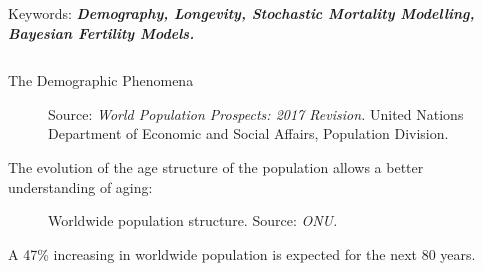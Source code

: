 \documentclass[]{beamer}
\begin{document}
\begin{frame}{\vspace{1ex}\hfill Keywords: \bfseries \textit{Demography, Longevity, Stochastic Mortality Modelling, Bayesian Fertility Models.}}
\begin{columns}[t]
\begin{block}{The Demographic Phenomena}
\begin{multicols}{2}
				\begin{figure}[h]
				\vspace{-0.4cm}
					\centering
					\caption{\small Source: \textit{World Population Prospects: 2017 Revision.} United Nations Department of Economic and Social Affairs, Population Division.}
					\label{fertilidad}
				\end{figure}
				The evolution of the age structure of the population allows a better understanding of aging:
				\begin{figure}[h]
					\centering
					\caption{\small Worldwide population structure. Source: \textit{ONU.}}
					\label{piramide}
					\end{figure}
					\vspace{-0.4cm}
					A 47\% increasing in worldwide population is expected for the next 80 years.

\end{multicols}
\end{block}
\end{columns}
\end{frame}
\end{document}
